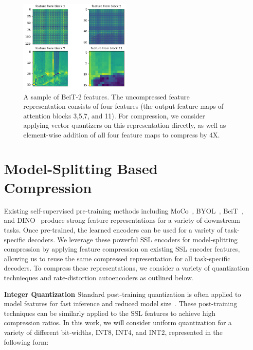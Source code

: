 \documentclass[10pt,twocolumn,letterpaper]{article}
\begin{document}
\begin{figure}
\begin{center}
\includegraphics[width=0.5\textwidth]{Figures/img0_patch0.png}
\end{center}
\caption{\label{fig:beit-features}%
A sample of BeiT-2 features. The uncompressed feature representation consists of four features (the output feature maps of attention blocks 3,5,7, and 11). For compression, we consider applying vector quantizers on this representation directly, as well as element-wise addition of all four feature maps to compress by 4X.}
\end{figure}

\section{Model-Splitting Based Compression}

Existing self-supervised pre-training methods including MoCo~\cite{chen2021empirical}, BYOL~\cite{grill2020bootstrap}, BeiT~\cite{peng2022beit}, and DINO~\cite{oquab2023dinov2} produce strong feature representations for a variety of downstream tasks. Once pre-trained, the learned encoders can be used for a variety of task-specific decoders. We leverage these powerful SSL encoders for model-splitting compression by applying feature compression on existing SSL encoder features, allowing us to reuse the same compressed representation for all task-specific decoders. To compress these representations, we consider a variety of quantization technieques and rate-distortion autoencoders as outlined below. 

\textbf{Integer Quantization} Standard post-training quantization is often applied to model features for fast inference and reduced model size~\cite{wu2020integer}. These post-training techniques can be similarly applied to the SSL features to achieve high compression ratios. In this work, we will consider uniform quantization for a variety of different bit-widths, INT8, INT4, and INT2, represented in the following form:
\end{document}
